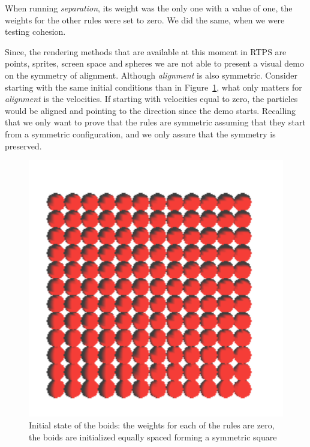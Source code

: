 When running \textit{separation}, its weight was the only one with a value of one, the weights for the other rules were set to zero. We did the same, when we were testing cohesion.

Since, the rendering methods that are available at this moment in RTPS are points, sprites, screen space and spheres we are not able to present a visual demo on the symmetry of alignment. Although \textit{alignment} is also symmetric. Consider starting with the same initial conditions than in Figure~\ref{alignRule}, what only matters for \textit{alignment} is the velocities. If starting with velocities equal to zero, the particles would be aligned and pointing to the direction since the demo starts. Recalling that we only want to prove that the rules are symmetric assuming that they start from a symmetric configuration, and we only assure that the symmetry is preserved.

\begin{figure}[htbp]
\begin{center}
\includegraphics[scale=0.5]{figures/align.pdf}
\caption{Initial state of the boids: the weights for each of the rules are zero, the boids are initialized equally spaced forming a symmetric square}
\label{alignRule}
\end{center}
\end{figure}

